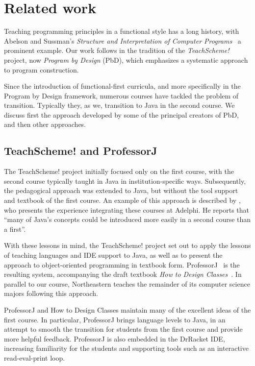 \documentclass[submission,copyright]{eptcs}
\begin{document}
\section{Related work}
\label{sec:related-work}

Teaching programming principles in a functional style has a long
history, with Abelson and Sussman's \emph{Structure and Interpretation
of Computer Programs}~\cite{dvanhorn:sicp} a prominent example.  Our
work follows in the tradition of the \emph{TeachScheme!} project, now
\emph{Program by Design} (PbD), which emphasizes a systematic
approach to program construction.  

Since the introduction of functional-first curricula, and more
specifically in the Program by Design framework, numerous courses have
tackled the problem of transition.  Typically they, as we, transition
to Java in the second course.  We discuss first the approach developed
by some of the principal creators of PbD, and then other approaches.

\subsection{TeachScheme! and ProfessorJ}

The TeachScheme! project initially focused only on the first course,
with the second course typically taught in Java in
institution-specific ways. Subsequently, the pedagogical approach was
extended to Java, but without the tool support and textbook of the
first course.  An example of this approach is described by
\citet{dvanhorn:Bloch2000Scheme}, who presents the experience
integrating these courses at Adelphi.  He reports that ``many of
Java's concepts could be introduced more easily in a second course
than a first''.

With these lessons in mind, the TeachScheme! project set out to apply
the lessons of teaching languages and IDE support to Java, as well as
to present the approach to object-oriented programming in textbook
form. ProfessorJ~\cite{dvanhorn:Gray2003ProfessorJ} is the resulting
system, accompanying the draft textbook \emph{How to Design
  Classes}~\cite{local:htdc}.  In parallel to our course, Northeastern
teaches the remainder of its computer science majors following this
approach.

ProfessorJ and How to Design Classes maintain many of the excellent
ideas of the first course.  In particular, ProfessorJ brings language
levels to Java, in an attempt to smooth the transition for students
from the first course and provide more helpful feedback.  ProfessorJ
is also embedded in the DrRacket IDE, increasing familiarity for the
students and supporting tools such as an interactive read-eval-print
loop. 
\end{document}
